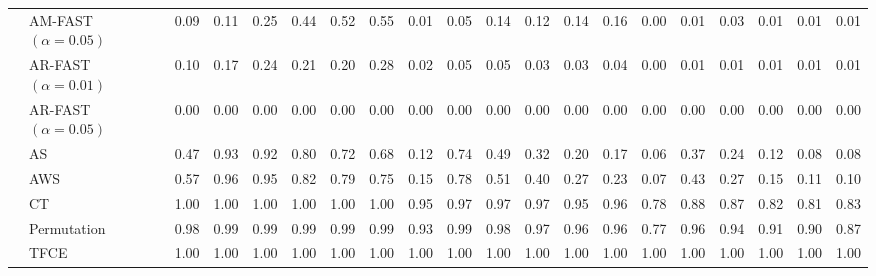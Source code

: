 \begin{table}[h]
{\begin{tabular}{|c|l|cccccc|cccccc|cccccc|}
        &  AM-FAST $(\alpha=0.05)$ & 0.09 & 0.11 & 0.25 & 0.44 & 0.52 & 0.55 & 0.01 & 0.05 & 0.14 & 0.12 & 0.14 & 0.16 & 0.00 & 0.01 & 0.03 & 0.01 & 0.01 & 0.01 \\
        &  AR-FAST $(\alpha=0.01)$& 0.10 & 0.17 & 0.24 & 0.21 & 0.20 & 0.28 & 0.02 & 0.05 & 0.05 & 0.03 & 0.03 & 0.04 & 0.00 & 0.01 & 0.01 & 0.01 & 0.01 & 0.01 \\ 
&  AR-FAST $(\alpha=0.05)$ & 0.00 & 0.00 & 0.00 & 0.00 & 0.00 & 0.00 & 0.00 & 0.00 & 0.00 & 0.00 & 0.00 & 0.00 & 0.00 & 0.00 & 0.00 & 0.00 & 0.00 & 0.00 \\ 
 & AS & 0.47 & 0.93 & 0.92 & 0.80 & 0.72 & 0.68 & 0.12 & 0.74 & 0.49 & 0.32 & 0.20 & 0.17 & 0.06 & 0.37 & 0.24 & 0.12 & 0.08 & 0.08 \\ 
  & AWS & 0.57 & 0.96 & 0.95 & 0.82 & 0.79 & 0.75 & 0.15 & 0.78 & 0.51 & 0.40 & 0.27 & 0.23 & 0.07 & 0.43 & 0.27 & 0.15 & 0.11 & 0.10 \\ 
 & CT & 1.00 & 1.00 & 1.00 & 1.00 & 1.00 & 1.00 & 0.95 & 0.97 & 0.97 & 0.97 & 0.95 & 0.96 & 0.78 & 0.88 & 0.87 & 0.82 & 0.81 & 0.83 \\ 
  & Permutation & 0.98 & 0.99 & 0.99 & 0.99 & 0.99 & 0.99 & 0.93 & 0.99 & 0.98 & 0.97 & 0.96 & 0.96 & 0.77 & 0.96 & 0.94 & 0.91 & 0.90 & 0.87 \\ 
  & TFCE & 1.00 & 1.00 & 1.00 & 1.00 & 1.00 & 1.00 & 1.00 & 1.00 & 1.00 & 1.00 & 1.00 & 1.00 & 1.00 & 1.00 & 1.00 & 1.00 & 1.00 & 1.00 \\ 
   \hline
      \end{tabular}
    }
  \end{table}


